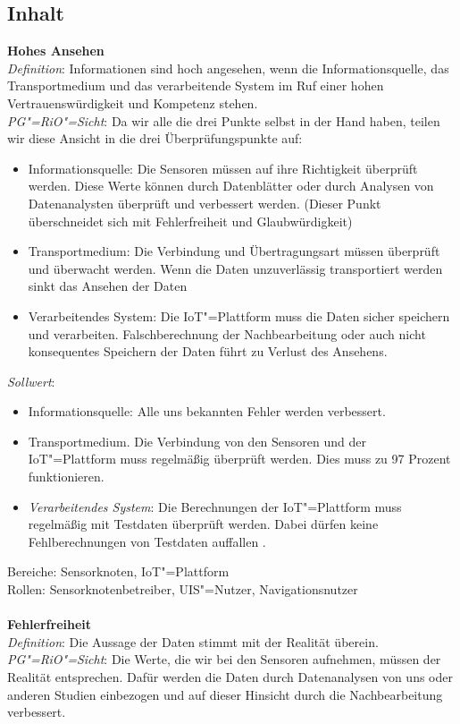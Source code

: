 \subsection{Inhalt}
\textbf{Hohes Ansehen}\\
\textit{Definition}: Informationen sind hoch angesehen, wenn die Informationsquelle, das Transportmedium und das verarbeitende System im Ruf einer hohen Vertrauenswürdigkeit und Kompetenz stehen. \\
\textit{PG"=RiO"=Sicht}: Da wir alle die drei Punkte selbst in der Hand haben, teilen wir diese Ansicht in die drei Überprüfungspunkte auf:
\begin{itemize}
\item	Informationsquelle: Die Sensoren müssen auf ihre Richtigkeit überprüft werden. Diese Werte können durch Datenblätter oder durch Analysen von Datenanalysten überprüft und verbessert werden. (Dieser Punkt überschneidet sich mit Fehlerfreiheit und Glaubwürdigkeit)
\item	Transportmedium: Die Verbindung und Übertragungsart müssen überprüft und überwacht werden. Wenn die Daten unzuverlässig transportiert werden sinkt das Ansehen der Daten
\item	Verarbeitendes System: Die IoT"=Plattform muss die Daten sicher speichern und verarbeiten. Falschberechnung der Nachbearbeitung oder auch nicht konsequentes Speichern der Daten führt zu Verlust des Ansehens.
\end{itemize}
\textit{Sollwert}:
\begin{itemize}
\item	Informationsquelle: Alle uns bekannten Fehler werden verbessert.
\item	Transportmedium. Die Verbindung von den Sensoren und der IoT"=Plattform muss regelmäßig überprüft werden. Dies muss zu 97 Prozent funktionieren.
\item	\textit{Verarbeitendes System}: Die Berechnungen der IoT"=Plattform muss regelmäßig mit Testdaten überprüft werden. Dabei dürfen keine Fehlberechnungen von Testdaten auffallen .
\end{itemize}
Bereiche: Sensorknoten, IoT"=Plattform \\
Rollen: Sensorknotenbetreiber, UIS"=Nutzer, Navigationsnutzer\\
\\
\textbf{Fehlerfreiheit} \\
\textit{Definition}: Die Aussage der Daten stimmt mit der Realität überein. \\
\textit{PG"=RiO"=Sicht}: Die Werte, die wir bei den Sensoren aufnehmen, müssen der Realität entsprechen. Dafür werden die Daten durch Datenanalysen von uns oder anderen Studien einbezogen und auf dieser Hinsicht durch die Nachbearbeitung verbessert. \\
